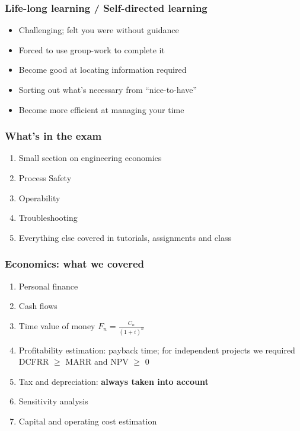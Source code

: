 \begin{frame}\frametitle{Life-long learning / Self-directed learning}
	\begin{itemize}
		\item	Challenging; felt you were without guidance
		\item	Forced to use group-work to complete it
		\item	Become good at locating information required
		\item	Sorting out what's necessary from ``nice-to-have''
		\item	Become more efficient at managing your time
	\end{itemize}
\end{frame}

\begin{frame}\frametitle{What's in the exam}
	\begin{enumerate}
		\item	Small section on engineering economics
		\item	Process Safety
		\item	Operability
		\item	Troubleshooting
		\item	Everything else covered in tutorials, assignments and class
	\end{enumerate}
\end{frame}

\begin{frame}\frametitle{Economics: what we covered}
	\begin{enumerate}
		\item	Personal finance
		\item	Cash flows
		\item	Time value of money $\displaystyle F_n = \frac{C_n}{(1+i)^n}$
		\item	Profitability estimation: payback time; for independent projects we required DCFRR $\geq$ MARR and NPV $\geq$ 0
		\item	Tax and depreciation: \textbf{always taken into account}
		\item	Sensitivity analysis
		\item	Capital and operating cost estimation
	\end{enumerate}
\end{frame}

